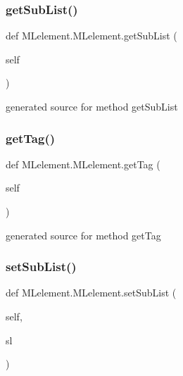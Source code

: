\subsubsection{\texorpdfstring{get\+Sub\+List()}{getSubList()}}
{\footnotesize\ttfamily def M\+Lelement.\+M\+Lelement.\+get\+Sub\+List (\begin{DoxyParamCaption}\item[{}]{self }\end{DoxyParamCaption})}

\begin{DoxyVerb}generated source for method getSubList \end{DoxyVerb}
 \hypertarget{class_m_lelement_1_1_m_lelement_a8c1b0ffc862b9aa99e6ac801e799a554}{}\label{class_m_lelement_1_1_m_lelement_a8c1b0ffc862b9aa99e6ac801e799a554} 
\subsubsection{\texorpdfstring{get\+Tag()}{getTag()}}
{\footnotesize\ttfamily def M\+Lelement.\+M\+Lelement.\+get\+Tag (\begin{DoxyParamCaption}\item[{}]{self }\end{DoxyParamCaption})}

\begin{DoxyVerb}generated source for method getTag \end{DoxyVerb}
 \hypertarget{class_m_lelement_1_1_m_lelement_a6cbd06fbe5d77837a736c035601d4d60}{}\label{class_m_lelement_1_1_m_lelement_a6cbd06fbe5d77837a736c035601d4d60} 
\subsubsection{\texorpdfstring{set\+Sub\+List()}{setSubList()}}
{\footnotesize\ttfamily def M\+Lelement.\+M\+Lelement.\+set\+Sub\+List (\begin{DoxyParamCaption}\item[{}]{self,  }\item[{}]{sl }\end{DoxyParamCaption})}



